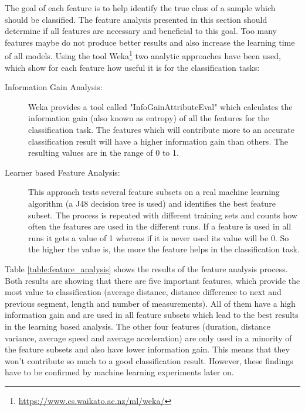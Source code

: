 The goal of each feature is to help identify the true class of a sample which should be classified. The feature analysis presented in this section should determine if all features are necessary and beneficial to this goal. Too many features maybe do not produce better results and also increase the learning time of all models. Using the tool Weka\footnote{\url{https://www.cs.waikato.ac.nz/ml/weka/}} two analytic approaches have been used, which show for each feature how useful it is for the classification tasks:

\begin{description}

\item[Information Gain Analysis:] Weka provides a tool called "InfoGainAttributeEval" which calculates the information gain (also known as entropy) of all the features for the classification task. The features which will contribute more to an accurate classification result will have a higher information gain than others. The resulting values are in the range of 0 to 1.

\item[Learner based Feature Analysis:] This approach tests several feature subsets on a real machine learning algorithm (a J48 decision tree is used) and identifies the best feature subset. The process is repeated with different training sets and counts how often the features are used in the different runs. If a feature is used in all runs it gets a value of 1 whereas if it is never used its value will be 0. So the higher the value is, the more the feature helps in the classification task.

\end{description}

Table \ref{table:feature_analysis} shows the results of the feature analysis process. Both results are showing that there are five important features, which provide the most value to classification (average distance, distance difference to next and previous segment, length and number of measurements). All of them have a high information gain and are used in all feature subsets which lead to the best results in the learning based analysis. The other four features (duration, distance variance, average speed and average acceleration) are only used in a minority of the feature subsets and also have lower information gain. This means that they won't contribute so much to a good classification result. However, these findings have to be confirmed by machine learning experiments later on.




